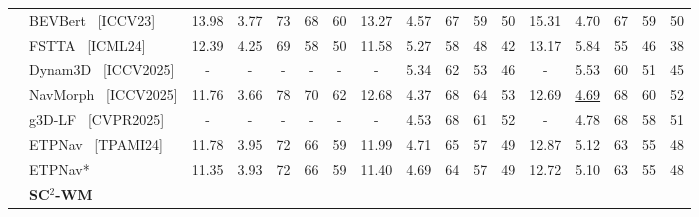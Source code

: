 \documentclass{article}
\theoremstyle{plain}
\theoremstyle{definition}
\theoremstyle{remark}
\begin{document}
\begin{table}[thpb]
{\begin{threeparttable}
\begin{tabular}{@{}c|l|ccccccccccccccc@{}}
			& BEVBert~\cite{an2023bevbert} {\scriptsize {\color{Gray} [ICCV23]}}& 13.98 & 3.77 & 73 & 68 & \multicolumn{1}{c|}{60} & 13.27 & 4.57 & 67 & 59 & \multicolumn{1}{c|}{50} & 15.31 & 4.70 & 67 & 59 & 50 \\ 
			& FSTTA~\cite{gao2024fast} {\scriptsize {\color{Gray} [ICML24]}}& 12.39 & 4.25 & 69 & 58 & \multicolumn{1}{c|}{50} & 11.58 & 5.27 & 58 & 48 & \multicolumn{1}{c|}{42} & 13.17 & 5.84 & 55 & 46 & 38 \\ 
            & {Dynam3D}~\cite{wang2025dynam3d} {\scriptsize {\color{Gray} [ICCV2025]}} & - & - & - & - & \multicolumn{1}{c|}{-} & - & 5.34  & 62 & 53 & \multicolumn{1}{c|}{46} & - & 5.53 & 60 & 51 & 45 \\ 
           & NavMorph~\cite{Yao2025navmorph} {\scriptsize {\color{Gray} [ICCV2025]}} & 11.76 & 3.66 & 78 & 70 & \multicolumn{1}{c|}{62} & 12.68 & 4.37 & 68 & 64 & \multicolumn{1}{c|}{53} & 12.69 & \underline{4.69} & 68 & 60 & 52 \\ 
           & g3D-LF~\cite{wang2025g3d} {\scriptsize {\color{Gray} [CVPR2025]}} & - & - & - & - & \multicolumn{1}{c|}{-} & - & 4.53 & 68 & 61 & \multicolumn{1}{c|}{52} & - & 4.78 & 68 &58 & 51 \\
             \cmidrule(l){2-17} 
              & ETPNav~\cite{an2024etpnav} {\scriptsize {\color{Gray} [TPAMI24]}}& 11.78 & 3.95 & 72 & 66 & \multicolumn{1}{c|}{59} & 11.99 & 4.71 & 65 & 57 & \multicolumn{1}{c|}{49} & 12.87 & 5.12 & 63 & 55 & 48 \\ 
              & \cellcolor{gray!5}ETPNav* & \multicolumn{1}{c}{\cellcolor{gray!5}11.35} & \multicolumn{1}{c}{\cellcolor{gray!5}3.93} & \multicolumn{1}{c}{\cellcolor{gray!5}72} & \multicolumn{1}{c}{\cellcolor{gray!5}66} &\multicolumn{1}{c|}{\cellcolor{gray!5}59} & \multicolumn{1}{c}{\cellcolor{gray!5}11.40} & \multicolumn{1}{c}{\cellcolor{gray!5}4.69} & \multicolumn{1}{c}{\cellcolor{gray!5}64} & \multicolumn{1}{c}{\cellcolor{gray!5}57} & \multicolumn{1}{c|}{\cellcolor{gray!5}49} & \cellcolor{gray!5}12.72 & \cellcolor{gray!5}5.10 & \cellcolor{gray!5}63 & \cellcolor{gray!5}55 & \cellcolor{gray!5}48 \\
             & \cellcolor{gray!15}\textbf{SC$^2$-WM} & \multicolumn{1}{c}{\cellcolor{gray!15}{12.15}} & \multicolumn{1}{c}{\cellcolor{gray!15}{\textcolor{blue}{3.85}}} & \multicolumn{1}{c}{\cellcolor{gray!15}{\textcolor{blue}{73}}} & \multicolumn{1}{c}{\cellcolor{gray!15}{\textcolor{blue}{68}}} & \multicolumn{1}{c|}{\cellcolor{gray!15}{\textcolor{blue}{60}}} & \multicolumn{1}{c}{\cellcolor{gray!15}{12.05}} & \multicolumn{1}{c}{\cellcolor{gray!15}{\textcolor{blue}{4.60}}} & \multicolumn{1}{c}{\cellcolor{gray!15}{\textcolor{blue}{68}}} & \multicolumn{1}{c}{\cellcolor{gray!15}{\textcolor{blue}{59}}} & \multicolumn{1}{c|}{\cellcolor{gray!15}{\textcolor{blue}{51}}} & {\cellcolor{gray!15}{13.88}} & \multicolumn{1}{c}{\cellcolor{gray!15}{\textcolor{blue}{4.97}}} & \multicolumn{1}{c}{\cellcolor{gray!15}{\textcolor{blue}{65}}} & \multicolumn{1}{c}{\cellcolor{gray!15}{\textcolor{blue}{57}}} & {\cellcolor{gray!15}{\textcolor{blue}{50}}}  \\

\end{tabular}
\end{threeparttable}}
\end{table}
\end{document}
